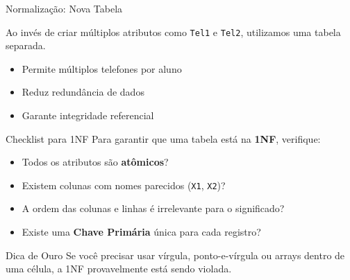 \documentclass[9pt]{beamer}
\begin{document}
\begin{frame}{Normalização: Nova Tabela}

\small
Ao invés de criar múltiplos atributos como \texttt{Tel1} e \texttt{Tel2}, utilizamos uma tabela separada.

\vspace{0.5cm}

\centering
{}

\vspace{0.5cm}

\begin{itemize}
    \item Permite múltiplos telefones por aluno
    \item Reduz redundância de dados
    \item Garante integridade referencial
\end{itemize}

\end{frame}
\begin{frame}{Checklist para 1NF}
  Para garantir que uma tabela está na \textbf{1NF}, verifique:
  \vspace{0.4cm}
  \begin{itemize}
    \item[$\square$] Todos os atributos são \textbf{atômicos}?
    \item[$\square$] Existem colunas com nomes parecidos (\texttt{X1}, \texttt{X2})?
    \item[$\square$] A ordem das colunas e linhas é irrelevante para o significado?
    \item[$\square$] Existe uma \textbf{Chave Primária} única para cada registro?
  \end{itemize}
  \vspace{0.4cm}
  \begin{block}{Dica de Ouro}
    Se você precisar usar vírgula, ponto-e-vírgula ou arrays dentro de uma célula, a 1NF provavelmente está sendo violada.
  \end{block}
\end{frame}
\end{document}
